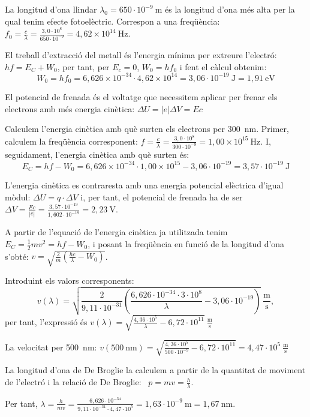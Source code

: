 \begin{solapartat}
 La longitud d'ona llindar $\lambda_0 = 650\cdot 10^{-9}\ \mathrm{m}$ és la longitud d'ona més alta per la qual tenim efecte fotoelèctric. Correspon a una freqüència: $f_0 = \frac{c}{\lambda} = \frac{3,0\cdot 10^{8}}{650\cdot 10^{-9}} = 4,62\times 10^{14}\ \mathrm{Hz}$.

 El treball d'extracció del metall és l'energia mínima per extreure l'electró: $hf = E_C + W_0$, per tant, per $E_c = 0$, $W_0 = hf_0$ i fent el càlcul obtenim:
\[ W_0 = hf_0 = 6,626\times 10^{-34}\cdot 4,62\times 10^{14} = 3,06\cdot 10^{-19}\ \mathrm{J} = 1,91\ \mathrm{eV} \]

 El potencial de frenada és el voltatge que necessitem aplicar per frenar els electrons amb més energia cinètica: $\Delta U = |e|\Delta V = Ec$

 Calculem l'energia cinètica amb què surten els electrons per 300~nm. Primer, calculem la freqüència corresponent: $f = \frac{c}{\lambda} = \frac{3,0\cdot 10^{8}}{300\cdot 10^{-9}} = 1,00\times 10^{15}\ \mathrm{Hz}$. I, seguidament, l'energia cinètica amb què surten és:
\[ E_C = hf - W_0 = 6,626\times 10^{-34}\cdot 1,00\times 10^{15} - 3,06\cdot 10^{-19} = 3,57\cdot 10^{-19}\ \mathrm{J} \]

 L'energia cinètica es contraresta amb una energia potencial elèctrica d'igual mòdul: $\Delta U = q\cdot\Delta V$ i, per tant, el potencial de frenada ha de ser $\Delta V = \frac{Ec}{|e|} = \frac{3,57\cdot 10^{-19}}{1,602\cdot 10^{-19}} = 2,23\ \mathrm{V}$.
\end{solapartat}

\begin{solapartat}
 A partir de l'equació de l'energia cinètica ja utilitzada tenim $E_C = \frac{1}{2}mv^2 = hf - W_0$, i posant la freqüència en funció de la longitud d'ona s'obté: $v = \sqrt{\frac{2}{m}\left(\frac{hc}{\lambda} - W_0\right)}$.

Introduint els valors corresponents:
\[ v(\lambda) = \sqrt{\frac{2}{9,11\cdot 10^{-31}}\left(\frac{6,626\cdot 10^{-34}\cdot 3\cdot 10^{8}}{\lambda} - 3,06\cdot 10^{-19}\right)}\ \mathrm{\frac{m}{s}}, \]
per tant, l'expressió és $v(\lambda) = \sqrt{\frac{4,36\cdot 10^{5}}{\lambda} - 6,72\cdot 10^{11}}\ \mathrm{\frac{m}{s}}$

 La velocitat per 500~nm: \quad $v(500\ \mathrm{nm}) = \sqrt{\frac{4,36\cdot 10^{5}}{500\cdot 10^{-9}} - 6,72\cdot 10^{11}} = 4,47\cdot 10^{5}\ \mathrm{\frac{m}{s}}$

 La longitud d'ona de De Broglie la calculem a partir de la quantitat de moviment de l'electró i la relació de De Broglie: \ $p = mv = \frac{h}{\lambda}$.

Per tant, $\lambda = \frac{h}{mv} = \frac{6,626\cdot 10^{-34}}{9,11\cdot 10^{-31}\cdot 4,47\cdot 10^{5}} = 1,63\cdot 10^{-9}\ \mathrm{m} = 1,67\ \mathrm{nm}$.
\end{solapartat}
